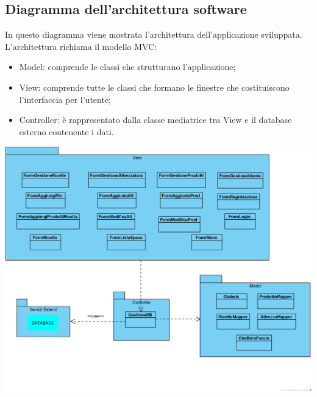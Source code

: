 \documentclass[a4paper, titlepage]{article}
\begin{document}
\subsection{Diagramma dell'architettura software}
In questo diagramma viene mostrata l'architettura dell'applicazione sviluppata.
L'architettura richiama il modello MVC:
\begin{itemize}
    \item Model: comprende le classi che strutturano l'applicazione;
    \item View: comprende tutte le classi che formano le finestre che costituiscono l'interfaccia per l'utente;
    \item Controller: è rappresentato dalla classe mediatrice tra View e il database esterno contenente i dati.
\end{itemize}
\includegraphics[scale=0.70]{Immagini/Diagramma Architettura Software_Brew Day!.png}

\newpage
\end{document}
